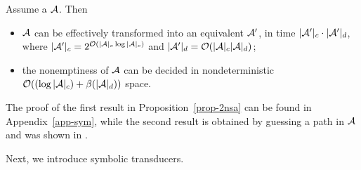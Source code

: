 \begin{proposition}\label{prop-2nsa}
Assume a \SSA  $\mathcal{A}$. Then
\begin{itemize}
\item $\mathcal{A}$ can be effectively transformed into an equivalent \SA{} $\mathcal{A}'$, in time $|\mathcal{A}'|_c \cdot |\mathcal{A}'|_d$, where $|\mathcal{A}'|_c = 2^{\mathcal{O}\left(|\mathcal{A}|_c \log |\mathcal{A}|_c\right)}$ and $|\mathcal{A}'|_d = \mathcal{O}(|\mathcal{A}|_c |\mathcal{A}|_d)$;
%
%
%
\item the nonemptiness of $\mathcal{A}$ can be decided in nondeterministic $\mathcal{O}( (\log |\mathcal{A}|_c) + \beta(|\mathcal{A}|_d))$ space.
\end{itemize}
\end{proposition}
The proof of the first result in Proposition~\ref{prop-2nsa} can be found in Appendix~\ref{app-sym}, while the second result is obtained by guessing a path in $\mathcal{A}$ and was shown in \cite{NG01,DV14}.

\smallskip

Next, we introduce symbolic transducers.






